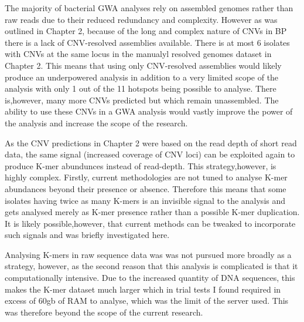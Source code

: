 \documentclass{article}
\begin{document}
The majority of bacterial GWA analyses rely on assembled genomes rather than raw reads due to their reduced redundancy and complexity. However as was outlined in Chapter 2, because of the long and complex nature of CNVs in BP there is a lack of CNV-resolved assemblies available. There is at most 6 isolates with CNVs at the same locus in the manualyl resolved genomes dataset in Chapter 2. This means that using only CNV-resolved assemblies would likely produce an underpowered analysis in addition to a very limited scope of the analysis with only 1 out of the 11 hotspots being possible to analyse. There is,however, many more CNVs predicted but which remain unassembled. The ability to use these CNVs in a GWA analysis would vastly improve the power of the analysis and increase the scope of the research.

%

As the CNV predictions in Chapter 2 were based on the read depth of short read data, the same signal (increased coverage of CNV loci) can be exploited again to produce K-mer abundunces instead of read-depth. This strategy,however, is highly complex. Firstly, current methodologies are not tuned to analyse K-mer abundances beyond their presence or absence. Therefore this means that some isolates having twice as many K-mers is an invisible signal to the analysis and gets analysed merely as K-mer presence rather than a possible K-mer duplication. It is likely possible,however, that current methods can be tweaked to incorporate such signals and was briefly investigated here. 

Analysing K-mers in raw sequence data was was not pursued more broadly as a strategy, however, as the second reason that this analysis is complicated is that it computationally intensive. Due to the increased quantity of DNA sequences, this makes the K-mer dataset much larger which in trial tests I found required in excess of 60gb of RAM to analyse, which was the limit of the server used. This was therefore beyond the scope of the current research.

\end{document}
